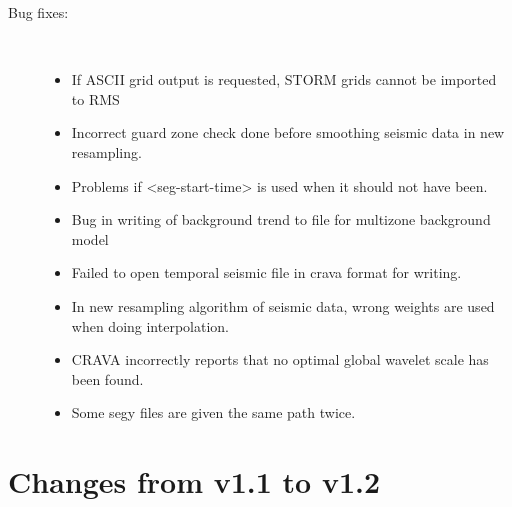\begin{description}
\item [Bug fixes:] \mbox{ }
  \begin{itemize}
  \item If ASCII grid output is requested, STORM grids cannot be imported to RMS 
    \item Incorrect guard zone check done before smoothing seismic data in new resampling. 
    \item Problems if <seg-start-time> is used when it should not have been. 
    \item Bug in writing of background trend to file for multizone background model 
    \item Failed to open temporal seismic file in crava format for writing. 
    \item In new resampling algorithm of seismic data, wrong weights are used when doing interpolation. 
    \item CRAVA incorrectly reports that no optimal global wavelet scale has been found. 
    \item Some segy files are given the same path twice. 
  \end{itemize}
\end{description}

\section{Changes from v1.1 to v1.2}

